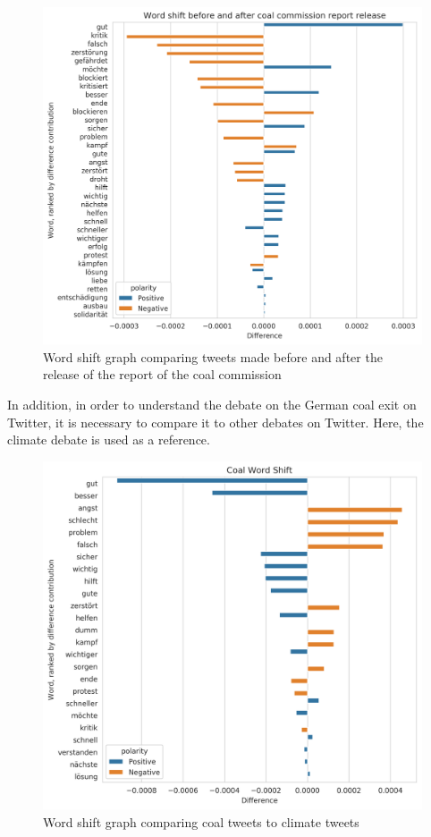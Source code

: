 \documentclass[12pt,onecolumn,twoside]{layout}
\begin{document}
\begin{figure} 
	\begin{center}
		\includegraphics[width=0.8\linewidth]{figures/wordshift_coalcomm_report}
	\end{center}
	\caption{Word shift graph comparing tweets made before and after the release of the report of the coal commission}
	\label{fig:wordshift_coalcomm_report}
\end{figure}


In addition, in order to understand the debate on the German coal exit on Twitter, it is necessary to compare it to other debates on Twitter. Here, the climate debate is used as a reference. 

\begin{figure} 
	\begin{center}
		\includegraphics[width=0.8\linewidth]{figures/wordshift_coal_climate}
	\end{center}
	\caption{Word shift graph comparing coal tweets to climate tweets}
	\label{fig:wordshift_coal_climate}
\end{figure}
\end{document}
